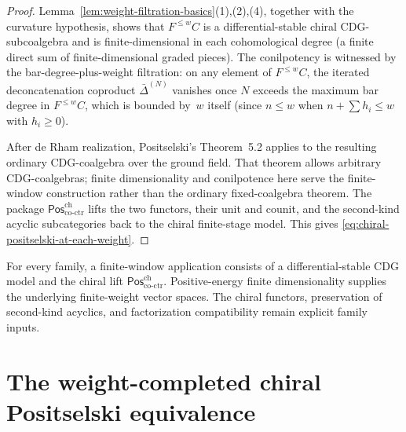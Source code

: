 \begin{proof}
Lemma~\ref{lem:weight-filtration-basics}(1),(2),(4), together with the
curvature hypothesis, shows that \(F^{\leq w}C\) is a
differential-stable chiral CDG-subcoalgebra and is finite-dimensional
in each cohomological degree
(a finite direct sum of finite-dimensional graded pieces). The
conilpotency is witnessed by the bar-degree-plus-weight filtration:
on any element of $F^{\leq w}C$, the iterated deconcatenation
coproduct $\bar{\Delta}^{(N)}$ vanishes once $N$ exceeds the maximum
bar degree in $F^{\leq w}C$, which is bounded by~$w$ itself (since
$n \leq w$ when $n + \sum h_i \leq w$ with $h_i \geq 0$).

After de Rham realization, Positselski's Theorem~5.2 applies to the
resulting ordinary CDG-coalgebra over the ground field.  That theorem
allows arbitrary CDG-coalgebras; finite dimensionality and
conilpotence here serve the finite-window construction rather than the
ordinary fixed-coalgebra theorem.  The package
\(\mathsf{Pos}^{\mathrm{ch}}_{\mathrm{co\text{-}ctr}}\) lifts the two
functors, their unit and counit, and the second-kind acyclic
subcategories back to the chiral finite-stage model.  This gives
\eqref{eq:chiral-positselski-at-each-weight}.
\end{proof}

\begin{remark}
\label{rem:independence-from-boundary}
For every family, a finite-window application consists of a
differential-stable CDG model and the chiral lift
\(\mathsf{Pos}^{\mathrm{ch}}_{\mathrm{co\text{-}ctr}}\).
Positive-energy finite dimensionality supplies the underlying
finite-weight vector spaces.  The chiral functors, preservation of
second-kind acyclics, and factorization compatibility remain explicit
family inputs.
\end{remark}

\section{The weight-completed chiral Positselski equivalence}
\label{sec:chiral-positselski-weight-completed}

